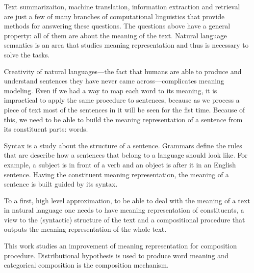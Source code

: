 Text summarizaiton, machine translation, information extraction and retrieval are just a few of many branches of computational linguistics that provide methods for answering these questions. The questions above have a general property: all of them are about the meaning of the text. Natural language semantics is an area that studies meaning representation and thus is necessary to solve the tasks.

Creativity of natural languages---the fact that humans are able to produce and understand sentences they have never came across---complicates meaning modeling. Even if we had a way to map each word to its meaning, it is impractical to apply the same procedure to sentences, because as we process a piece of text most of the sentences in it will be seen for the fist time. Because of this, we need to be able to build the meaning representation of a sentence from its constituent parts: words.

Syntax is a study about the structure of a sentence. Grammars define the rules that are describe how a sentences that belong to a language should look like. For example, a subject is in front of a verb and an object is after it in an English sentence. Having the constituent meaning representation, the meaning of a sentence is built guided by its syntax.

To a first, high level approximation, to be able to deal with the meaning of a text in natural language one needs to have meaning representation of constituents, a view to the (syntactic) structure of the text and a compositional procedure that outputs the meaning representation of the whole text.

This work studies an improvement of meaning representation for composition procedure. Distributional hypothesis \cite{harris1954distributional} is used to produce word meaning and categorical composition \cite{DBLP:journals/corr/abs-1003-4394} is the composition mechanism.


